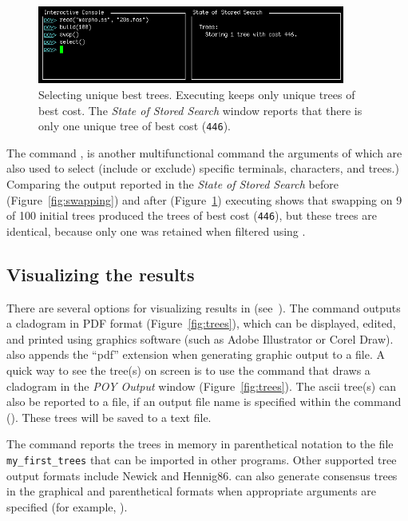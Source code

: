 {\begin{figure}[]
\begin{center}
\includegraphics[width=0.9\textwidth]{doc/figures/select.jpg}
\end{center}
\caption{Selecting unique best trees. Executing  keeps only unique trees of best cost. The 
\emph{State of Stored Search} window reports that there is only one unique tree of best cost (\texttt{446}).}
\label{fig:select}
\end{figure}

The command , is another multifunctional command the arguments of which are also used to 
select (include or exclude) specific terminals, characters, and trees.) Comparing the output reported in the 
\emph{State of Stored Search} before (Figure~\ref{fig:swapping}) and after (Figure~\ref{fig:select}) executing 
 shows that swapping on 9 of 100 initial trees produced the trees of best cost (\texttt{446}), 
but these trees are identical, because only one was retained when filtered using .

\subsection{Visualizing the results}

There are several options for visualizing results in \poy (see~). The command
 outputs a cladogram in PDF format (Figure~\ref{fig:trees}), 
which can be displayed, edited, and printed using graphics software (such as Adobe Illustrator or Corel Draw). 
\poy also appends the ``pdf'' extension when generating graphic output to a file. A quick way to see the tree(s) on screen 
is to use the command  that draws a cladogram in the \emph{POY Output} window 
(Figure~\ref{fig:trees}). The ascii tree(s) can also be reported to a file, if an output file name is specified within the 
command ().  These trees will be saved to a text file.

The command  reports the trees in memory in parenthetical 
notation to the file \texttt{my\_first\_trees} that can be imported in other programs. Other supported tree output 
formats include Newick and Hennig86.  can also generate consensus trees in the graphical 
and parenthetical formats when appropriate arguments are specified (for example, ).

}
